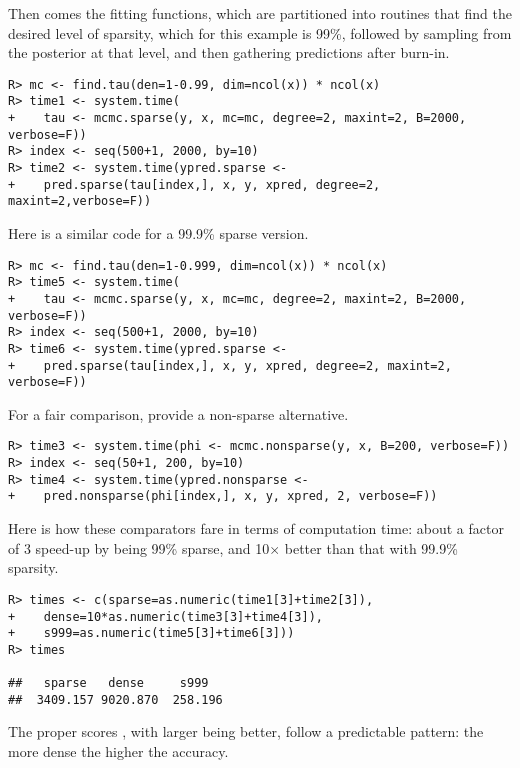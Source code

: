 \documentclass[12pt]{article}
\begin{document}
\noindent Then comes the fitting functions, which are partitioned into routines 
that find the desired level of sparsity, which for this example is 99\%, followed
by sampling from the posterior at that level, and then gathering predictions
after burn-in.

{\singlespacing
\begin{verbatim}
R> mc <- find.tau(den=1-0.99, dim=ncol(x)) * ncol(x)
R> time1 <- system.time(
+    tau <- mcmc.sparse(y, x, mc=mc, degree=2, maxint=2, B=2000, verbose=F))
R> index <- seq(500+1, 2000, by=10)
R> time2 <- system.time(ypred.sparse <- 
+    pred.sparse(tau[index,], x, y, xpred, degree=2, maxint=2,verbose=F))
\end{verbatim}}

\noindent Here is a similar code for a 99.9\% sparse version.

{\singlespacing
\begin{verbatim}
R> mc <- find.tau(den=1-0.999, dim=ncol(x)) * ncol(x) 
R> time5 <- system.time(
+    tau <- mcmc.sparse(y, x, mc=mc, degree=2, maxint=2, B=2000, verbose=F))
R> index <- seq(500+1, 2000, by=10)
R> time6 <- system.time(ypred.sparse <- 
+    pred.sparse(tau[index,], x, y, xpred, degree=2, maxint=2, verbose=F))
\end{verbatim}}

\noindent For a fair comparison, \citet{kaufman:etal:2012} provide a non-sparse alternative.

{\singlespacing
\begin{verbatim}
R> time3 <- system.time(phi <- mcmc.nonsparse(y, x, B=200, verbose=F))
R> index <- seq(50+1, 200, by=10)
R> time4 <- system.time(ypred.nonsparse <- 
+    pred.nonsparse(phi[index,], x, y, xpred, 2, verbose=F))
\end{verbatim}}

\noindent Here is how these comparators fare in terms of computation time: about a factor 
of 3 speed-up by being 99\% sparse, and 10$\times$ better than that with 99.9\%
sparsity.

{\singlespacing
\begin{verbatim}
R> times <- c(sparse=as.numeric(time1[3]+time2[3]), 
+    dense=10*as.numeric(time3[3]+time4[3]), 
+    s999=as.numeric(time5[3]+time6[3]))
R> times

##   sparse   dense     s999 
##  3409.157 9020.870  258.196
\end{verbatim}}

\noindent The proper scores \citep[Eq.~(27)][]{gneiting:raftery:2007}, with larger being
better, follow a predictable pattern: the more dense the higher the accuracy.
\end{document}
